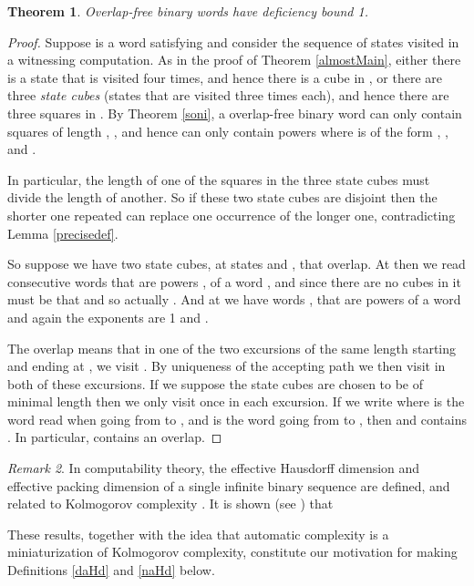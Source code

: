 \documentclass[12pt]{article}
\theoremstyle{plain}
\newtheorem{thm}{Theorem}
\theoremstyle{definition}
\theoremstyle{remark}
\newtheorem{rem}[thm]{Remark}
\begin{document}
			\begin{thm}\label{main}
				Overlap-free binary words have deficiency bound 1.
			\end{thm}
			\begin{proof}
				Suppose  is a word satisfying  and consider the sequence of states visited in a witnessing computation.
				As in the proof of Theorem \ref{almostMain}, either there is a state that is visited four times, and hence there is a cube in ,
				or there are three \emph{state cubes} (states that are visited three times each), and hence there are three squares in .
				By Theorem \ref{soni}, a overlap-free binary word can only contain squares of length , ,
				and hence can only contain powers  where  is of the form , , and .

				In particular, the length of one of the squares in the three state cubes must divide the length of another.
				So if these two state cubes are disjoint then the shorter one repeated
				can replace one occurrence of the longer one, contradicting Lemma \ref{precisedef}.

				So suppose we have two state cubes, at states  and , that overlap.
				At  then we read consecutive words  that are powers ,  of a word , and since
				there are no cubes in  it must be that  and so actually .
				And at  we have words ,  that are powers of a word  and again the exponents are 1 and .

				The overlap means that in one of the two excursions of the same length starting and ending at ,
				we visit . By uniqueness of the accepting path
				we then visit  in both of these excursions.
				If we suppose the state cubes are chosen to be of minimal length then we only visit  once in each excursion.
				If we write  where  is the word read when going from  to , and  is the word going from  to , then
				 and  contains . In particular,  contains an overlap.
			\end{proof}
			\begin{rem}
				In computability theory, the effective Hausdorff dimension  and effective packing dimension  of
				a single infinite binary sequence  are defined, and related to Kolmogorov complexity .
				It is shown (see \cite[Theorem 13.3.4 and Corollary 13.11.12]{DH}) that
				
				These results, together with the idea that automatic complexity is a miniaturization of Kolmogorov complexity,
				constitute our motivation for making Definitions \ref{daHd} and \ref{naHd} below.
			\end{rem}
\end{document}
